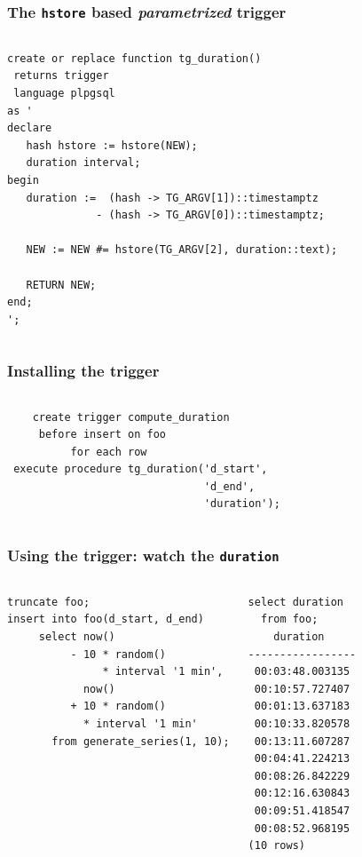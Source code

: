 \documentclass{beamer}
\begin{document}
\begin{frame}[fragile]
  \frametitle{The \texttt{hstore} based \textit{parametrized} trigger}

\begin{columns}
\begin{verbatim}
create or replace function tg_duration()
 returns trigger
 language plpgsql
as '
declare
   hash hstore := hstore(NEW);
   duration interval;
begin
   duration :=  (hash -> TG_ARGV[1])::timestamptz
              - (hash -> TG_ARGV[0])::timestamptz;

   NEW := NEW #= hstore(TG_ARGV[2], duration::text);

   RETURN NEW;
end;
';
\end{verbatim}
\end{columns}
\end{frame}

\begin{frame}[fragile]
  \frametitle{Installing the trigger}

  \vfill

\begin{columns}
\begin{verbatim}
    create trigger compute_duration
     before insert on foo
          for each row
 execute procedure tg_duration('d_start',
                               'd_end',
                               'duration');
\end{verbatim}  
\end{columns}
\end{frame}

\begin{frame}[fragile]
  \frametitle{Using the trigger: watch the \texttt{duration}}

\begin{columns}
\begin{verbatim}
truncate foo;
insert into foo(d_start, d_end)
     select now()
          - 10 * random()
               * interval '1 min',
            now()
          + 10 * random()
            * interval '1 min'
       from generate_series(1, 10);
\end{verbatim}  
\begin{verbatim}
select duration
  from foo;
    duration     
-----------------
 00:03:48.003135
 00:10:57.727407
 00:01:13.637183
 00:10:33.820578
 00:13:11.607287
 00:04:41.224213
 00:08:26.842229
 00:12:16.630843
 00:09:51.418547
 00:08:52.968195
(10 rows)
\end{verbatim}  
\end{columns}
\end{frame}
\end{document}
